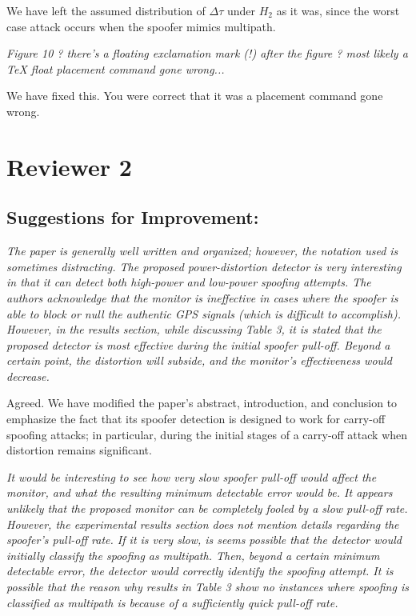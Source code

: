 \documentclass[12pt]{report}
\begin{document}
    We have left the assumed distribution of $\Delta \tau$ under $H_2$ as it
    was, since the worst case attack occurs when the spoofer mimics multipath.
  

{\textit{Figure 10 ? there's a floating exclamation mark (!) after
      the figure ? most
likely a TeX float placement command gone
      wrong...}}

  
  {{We have fixed this.  You were correct that it was a placement command
        gone wrong.}}
  



\section*{Reviewer 2}
\subsection*{Suggestions for Improvement:}

{\textit{The paper is generally well written and organized; however, the
      notation used is sometimes distracting. The proposed power-distortion
      detector is very interesting in that it can detect both high-power and
      low-power spoofing attempts. The authors acknowledge that the monitor is
      ineffective in cases where the spoofer is able to block or null the
      authentic GPS signals (which is difficult to accomplish). However, in
      the results section, while discussing Table 3, it is stated that the
      proposed detector is most effective during the initial spoofer
      pull-off. Beyond a certain point, the distortion will subside, and the
      monitor's effectiveness would decrease.}}

  
   Agreed.  We have modified the paper's abstract, introduction, and
    conclusion to emphasize the fact that its spoofer detection is designed to
    work for carry-off spoofing attacks; in particular, during the initial
    stages of a carry-off attack when distortion remains significant. 
  

{\textit{It would be interesting to see how very slow spoofer pull-off
      would affect the monitor, and what the resulting minimum detectable
      error would be. It appears unlikely that the proposed monitor can be
      completely fooled by a slow pull-off rate. However, the experimental
      results section does not mention details regarding the spoofer's
      pull-off rate. If it is very slow, is seems possible that the detector
      would initially classify the spoofing as multipath. Then, beyond a
      certain minimum detectable error, the detector would correctly identify
      the spoofing attempt. It is possible that the reason why results in
      Table 3 show no instances where spoofing is classified as multipath is
      because of a sufficiently quick pull-off rate.}}
\end{document}
